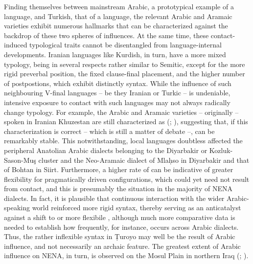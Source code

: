 \documentclass[output=paper,colorlinks,citecolor=brown,draftmode]{langscibook}
\begin{document}
\begin{sloppypar}
Finding themselves between mainstream Arabic, a prototypical example of a  language, and Turkish, that of a  language, the relevant Arabic and Aramaic varieties exhibit numerous hallmarks that can be characterized against the backdrop of these two spheres of influences. At the same time, these contact-induced typological traits cannot be disentangled from language-internal developments. Iranian languages like Kurdish, in turn, have a more mixed  typology, being in several respects rather similar to Semitic, except for the more rigid preverbal  position, the fixed clause-final  placement, and the higher number of postpostions, which exhibit distinctly  syntax. While the influence of such neighbouring V-final languages -- be they Iranian or Turkic -- is undeniable, intensive exposure to contact with such languages may not always radically change  typology. For example, the Arabic and Aramaic varieties -- originally -- spoken in Iranian Khuzestan are still characterized as  (\citealt[735]{Haberl2011NeoMandaic}; \citealt{ElZarkaZiagos2020WOCA}), suggesting that, if this characterization is correct -- which is still a matter of debate --,  can be remarkably stable. This notwithstanding, local  languages doubtless affected the peripheral Anatolian Arabic dialects belonging to the Diyarbakir or Kozluk-Sason-Muş cluster and the Neo-Aramaic dialect of Mlaḥso in Diyarbakir and that of Bohtan in Siirt. Furthermore, a higher rate of  can be indicative of greater  flexibility for pragmatically driven configurations, which could yet need not result from contact, and this is presumably the situation in the majority of NENA dialects. In fact, it is plausible that continuous interaction with the wider Arabic-speaking world reinforced more rigid  syntax, thereby serving as an anticatalyst against a shift to  or more flexibile , although much more comparative data is needed to establish how frequently, for instance,   occurs across Arabic dialects. Thus, the rather inflexible  syntax in Ṭuroyo may well be the result of Arabic influence, and not necessarily an archaic feature. The greatest extent of Arabic influence on NENA, in turn, is observed on the Mosul Plain in northern Iraq (\citealt{Khan2002Qaraqosh}; \citealt{Coghill2020NA}).
\end{sloppypar}
\end{document}
